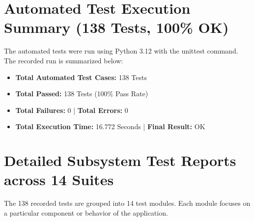 \documentclass[12pt,letterpaper,oneside]{report}
\begin{document}
\section{Automated Test Execution Summary (138 Tests, 100\% OK)}
The automated tests were run using Python 3.12 with the unittest command. The recorded run is summarized below:
\begin{itemize}
    \item \textbf{Total Automated Test Cases:} 138 Tests
    \item \textbf{Total Passed:} 138 Tests (100\% Pass Rate)
    \item \textbf{Total Failures:} 0 | \textbf{Total Errors:} 0
    \item \textbf{Total Execution Time:} 16.772 Seconds | \textbf{Final Result:} OK
\end{itemize}

\section{Detailed Subsystem Test Reports across 14 Suites}
The 138 recorded tests are grouped into 14 test modules. Each module focuses on a particular component or behavior of the application.
\end{document}
